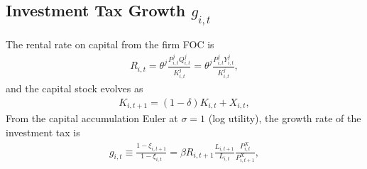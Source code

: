 \documentclass[10pt]{article}
\begin{document}
\subsection*{Investment Tax Growth $g_{i,t}$}
The rental rate on capital from the firm FOC is
\begin{align}
  R_{i,t} = \theta^j \frac{P^j_{i,t} Q^j_{i,t}}{K^j_{i,t}} = \theta^j \frac{P^j_{i,t} Y^j_{i,t}}{K^j_{i,t}}, \label{eq:rental}
\end{align}
and the capital stock evolves as
\begin{align}
  K_{i,t+1} = (1 - \delta) K_{i,t} + X_{i,t}, \label{eq:kpath}
\end{align}
From the capital accumulation Euler at $\sigma = 1$ (log utility), the growth rate
of the investment tax is
\begin{align}
  g_{i,t} \equiv \frac{1 - \xi_{i,t+1}}{1 - \xi_{i,t}} =
  \beta R_{i,t+1} \frac{L_{i,t+1}}{L_{i,t}}
  \frac{P^{X}_{i,t}}{P^{X}_{i,t+1}}, \label{eq:xi-recover}
\end{align}

\end{document}
